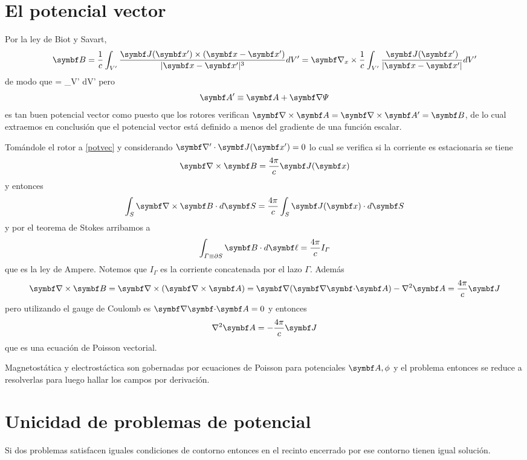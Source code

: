\documentclass[10pt,oneside]{CBFT_book}
\begin{document}
\section{El potencial vector}

Por la ley de Biot y Savart,
\[
	\vb{B} = \frac{1}{c} \int_{V'} \frac{\vb{J}(\vb{x}') \times (\vb{x}-\vb{x}')}{|\vb{x}-\vb{x}'|^3} 
	dV' = \Nabla_x \times \frac{1}{c} \int_{V'} \frac{\vb{J}(\vb{x}')}{|\vb{x}-\vb{x}'|} dV'
\]
de modo que
\be
	 =  \int_{V'}  dV'
	\label{potvec}
\ee
pero 
\[
	\vb{A}' \equiv \vb{A} + \Nabla \Psi
\]
es tan buen potencial vector como  puesto que los rotores verifican $\rotorm{A}=\rotorm{A}'=\vb{B}$,
de lo cual extraemos en conclusión que el potencial vector está definido a menos del gradiente de una
función escalar.

Tomándole el rotor a \eqref{potvec} y considerando $\Nabla'\cdot\vb{J}(\vb{x}')=0$ lo cual se verifica si
la corriente es estacionaria se tiene 
\[
	\rotorm{B} = \frac{4\pi}{c} \vb{J}(\vb{x})
\]
y entonces
\[
	\int_S \rotorm{B} \cdot d\vb{S} = \frac{4\pi}{c} \int_S \vb{J}(\vb{x}) \cdot d\vb{S}
\]
y por el teorema de Stokes arribamos a
\[
	\int_{\Gamma\equiv\partial S} \vb{B}\cdot d\vb{\ell} = \frac{4\pi}{c} I_\Gamma
\]
que es la ley de Ampere. Notemos que $I_\Gamma$ es la corriente concatenada por el lazo $\Gamma$.
Además
\[
	\rotorm{B} = \Nabla\times(\rotorm{A}) = \Nabla(\divem{A}) - \nabla^2 \vb{A} = \frac{4\pi}{c}\vb{J}
\]
pero utilizando el gauge de Coulomb es $\divem{A}=0$ y entonces
\[
	\nabla^2 \vb{A} = -\frac{4\pi}{c}\vb{J}
\]
que es una ecuación de Poisson vectorial.

Magnetostática y electrostáctica son gobernadas por ecuaciones de Poisson para potenciales $\vb{A},\phi$ y
el problema entonces se reduce a resolverlas para luego hallar los campos por derivación.

\section{Unicidad de problemas de potencial}

Si dos problemas satisfacen iguales condiciones de contorno entonces en el recinto encerrado por
ese contorno tienen igual solución.
\end{document}
